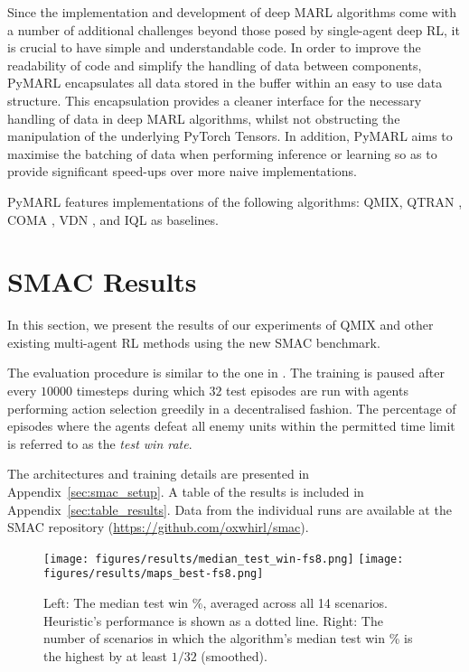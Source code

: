 \documentclass[twoside,11pt]{article}
\renewcommand{\cite}{\citep}
\begin{document}
Since the implementation and development of deep MARL algorithms come with a number of additional challenges beyond those posed by single-agent deep RL, it is crucial to have simple and understandable code. In order to improve the readability of code and simplify the handling of data between components, PyMARL encapsulates all data stored in the buffer within an easy to use data structure. This encapsulation provides a cleaner interface for the necessary handling of data in deep MARL algorithms, whilst not obstructing the manipulation of the underlying PyTorch Tensors. In addition, PyMARL aims to maximise the batching of data when performing inference or learning so as to provide significant speed-ups over more naive implementations. 

PyMARL features implementations of the following algorithms: QMIX, QTRAN \cite{son_qtran:_2019}, COMA \cite{foerster_counterfactual_2017}, VDN \cite{sunehag_value-decomposition_2017}, and IQL \cite{tan_multi-agent_1993} as baselines.




 \section{SMAC Results}
\label{sec:results}



In this section, we present the results of our experiments of QMIX and other existing multi-agent RL methods using the new SMAC benchmark.

The evaluation procedure is similar to the one in \cite{rashid2018qmix}. The training is paused after every $10000$ timesteps during which $32$ test episodes are run with agents performing action selection greedily in a decentralised fashion. The percentage of episodes where the agents defeat all enemy units within the permitted time limit is referred to as the \textit{test win rate}.

The architectures and training details are presented in Appendix~\ref{sec:smac_setup}.
A table of the results is included in Appendix~\ref{sec:table_results}.
Data from the individual runs are available at the SMAC repository (\url{https://github.com/oxwhirl/smac}).

\begin{figure*}[h!]
	\centering
	\texttt{[image: figures/results/median\_test\_win-fs8.png]}
	\texttt{[image: figures/results/maps\_best-fs8.png]}
	\caption{Left: The median test win \%, averaged across all 14 scenarios. Heuristic's performance is shown as a dotted line. Right: The number of scenarios in which the algorithm's median test win \% is the highest by at least $1/32$ (smoothed).}
	\label{fig:median_test_win}
\end{figure*}
\end{document}

